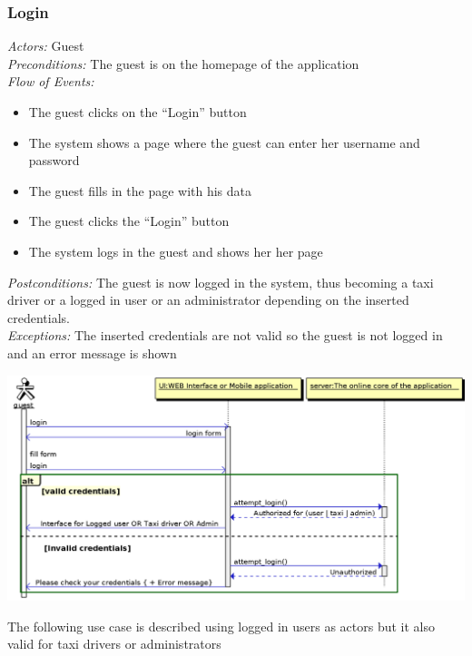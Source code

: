 \documentclass{article}
\begin{document}
\subsubsection{Login}
\textit{Actors:} Guest
\\\textit{Preconditions:} The guest is on the homepage of the application
\\\textit{Flow of Events:}
\begin{itemize}
	\item  The guest clicks on the ``Login'' button
	\item  The system shows a page where the guest can enter her username and password
	\item  The guest fills in the page with his data
	\item  The guest clicks the ``Login'' button
	\item  The system logs in the guest and shows her her page
\end{itemize}
\textit{Postconditions:} The guest is now logged in the system, thus becoming a taxi driver or a logged in user or an administrator depending on the inserted credentials.
\\\textit{Exceptions:} The inserted credentials are not valid so the guest is not logged in and an error message is shown
\begin{center}	
	\includegraphics[width=\textwidth,keepaspectratio]{Sequence-Diagrams/login}
\end{center}

The following use case is described using logged in users as actors but it also valid for taxi drivers or administrators
\end{document}
